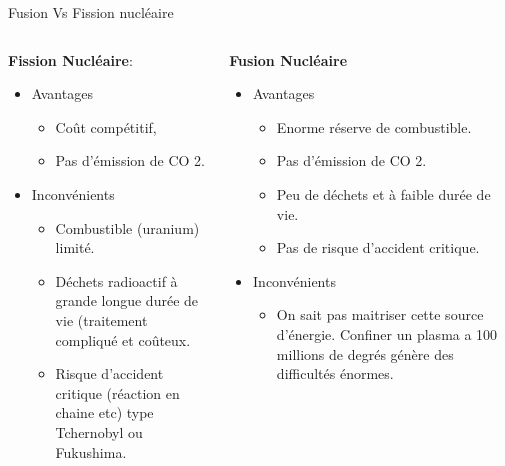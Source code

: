 \begin{frame}{Fusion Vs Fission nucl\'eaire}
\small
\begin{columns}
\begin{column}{6cm}
\textbf{Fission Nucl\'eaire}:
\begin{itemize}
\item Avantages
\begin{itemize}
\item Co\^{u}t comp\'etitif, 
\item Pas d'\'emission de CO 2.
\end{itemize}
\item Inconv\'enients
\begin{itemize}
\item Combustible (uranium) limit\'e.
\item D\'echets radioactif \`a grande longue dur\'ee de vie (traitement compliqu\'e et co\^{u}teux.
\item Risque d'accident critique (r\'eaction en chaine etc) type Tchernobyl ou Fukushima.
\end{itemize}
\end{itemize}
\end{column}
\begin{column}{6cm}
\textbf{Fusion Nucl\'eaire}
\begin{itemize}
\item Avantages
\begin{itemize}
\item Enorme r\'eserve de combustible.
\item Pas d'\'emission de CO 2.
\item Peu de d\'echets et \`a faible dur\'ee de vie.
\item Pas de risque d'accident critique.
\end{itemize}
\item Inconv\'enients
\begin{itemize}
\item On sait pas maitriser cette source d'\'energie. Confiner un plasma a 100 millions de degr\'es g\'en\`ere des difficult\'es \'enormes.  
\end{itemize}
\end{itemize}
\end{column}
\end{columns}
\end{frame}


